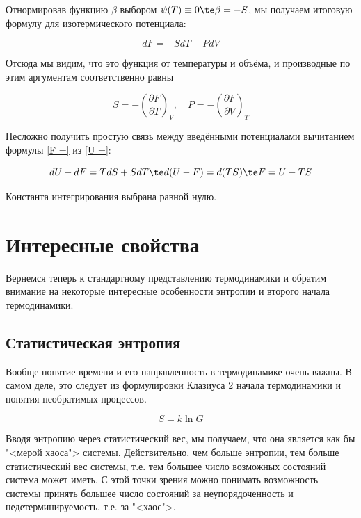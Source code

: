 \documentclass[12pt]{kiarticle}
\newcommand{\spdd}[2]{\left( \frac{\partial #1}{\partial #2} \right)}
\begin{document}
Отнормировав функцию $ \beta $ выбором $ \psi(T) \equiv 0 \te \beta=-S $, мы получаем итоговую формулу для изотермического потенциала:

\begin{equation}\label{F =}
dF = - SdT - PdV
\end{equation}

Отсюда мы видим, что это функция от температуры и объёма, и производные по этим аргументам соответственно равны 

\begin{equation}\label{}
S = -\spdd{F}{T}_V, \quad P = - \spdd{F}{V}_T
\end{equation}

Несложно получить простую связь между введёнными потенциалами вычитанием формулы \eqref{F =} из \eqref{U =}:

\begin{equation}\label{}
dU - dF = TdS + SdT \te d(U - F) = d(TS) \te F = U - TS
\end{equation}

Константа интегрирования выбрана равной нулю. 



\newpage %
\section{Интересные свойства}

Вернемся теперь к стандартному представлению термодинамики и обратим внимание на некоторые интересные особенности энтропии и второго начала термодинамики.

\subsection{Статистическая энтропия}

Вообще понятие времени и его направленность в термодинамике очень важны. В самом деле, это следует из формулировки Клазиуса 2 начала термодинамики и понятия необратимых процессов.
 
 \begin{equation}\label{}
 S = k \ln G
 \end{equation}
 
 Вводя энтропию через статистический вес, мы получаем, что она является как бы "<мерой хаоса"> системы. Действительно, чем больше энтропии, тем больше статистический вес системы, т.е. тем большее число возможных состояний система может иметь. С этой точки зрения можно понимать возможность системы принять большее число состояний за неупорядоченность и недетерминируемость, т.е. за "<хаос">.
\end{document}
